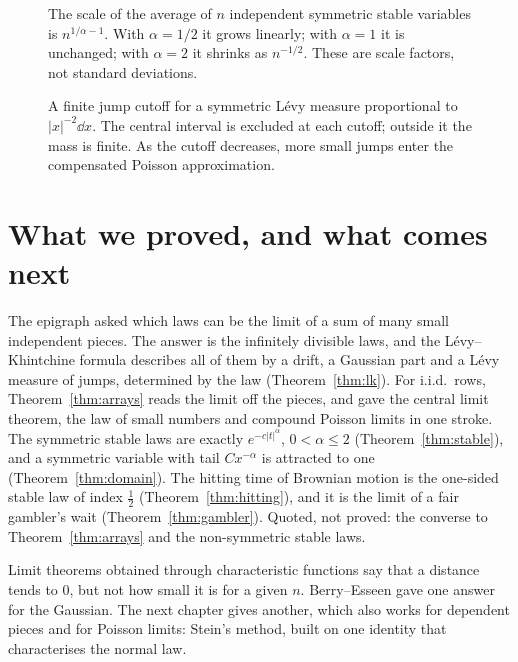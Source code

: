 \begin{figure}[ht]
\centering{}
\caption{The scale of the average of $n$ independent symmetric stable variables is $n^{1/\alpha-1}$. With $\alpha=1/2$ it grows linearly; with $\alpha=1$ it is unchanged; with $\alpha=2$ it shrinks as $n^{-1/2}$. These are scale factors, not standard deviations.}
\label{fig:v11-ch05-average-scale}
\end{figure}

\begin{figure}[ht]
\centering{}
\caption{A finite jump cutoff for a symmetric L\'evy measure proportional to $|x|^{-2}\dd x$. The central interval is excluded at each cutoff; outside it the mass is finite. As the cutoff decreases, more small jumps enter the compensated Poisson approximation.}
\label{fig:v11-ch05-levy-cutoff}
\end{figure}

\section{What we proved, and what comes next}

The epigraph asked which laws can be the limit of a sum of many small independent pieces. The answer is the infinitely divisible laws, and the
L\'evy--Khintchine formula describes all of them by a drift, a Gaussian part and a L\'evy measure of jumps, determined by the law
(Theorem~\ref{thm:lk}). For i.i.d.\ rows, Theorem~\ref{thm:arrays} reads the limit off the pieces, and gave the central limit theorem, the law of small
numbers and compound Poisson limits in one stroke. The symmetric stable laws are exactly $e^{-c|t|^\alpha}$, $0<\alpha\le2$ (Theorem~\ref{thm:stable}),
and a symmetric variable with tail $Cx^{-\alpha}$ is attracted to one (Theorem~\ref{thm:domain}). The hitting time of Brownian motion is the one-sided
stable law of index $\frac12$ (Theorem~\ref{thm:hitting}), and it is the limit of a fair gambler's wait (Theorem~\ref{thm:gambler}). Quoted, not
proved: the converse to Theorem~\ref{thm:arrays} and the non-symmetric stable laws.

Limit theorems obtained through characteristic functions say that a distance tends to $0$, but not how small it is for a given $n$. Berry--Esseen
gave one answer for the Gaussian. The next chapter gives another, which also works for dependent pieces and for Poisson limits: Stein's method,
built on one identity that characterises the normal law.

